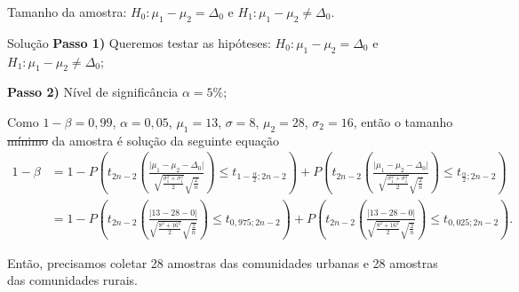 \documentclass[9pt]{beamer}
\begin{document}
\begin{frame}{Tamanho da amostra: $H_0:\mu_1 - \mu_2 = \Delta_0$ e $H_1: \mu_1 - \mu_2 \neq \Delta_0$.}

\begin{block}{Solução}
	\textbf{Passo 1)} Queremos testar as hipóteses: $H_0: \mu_1 - \mu_2 = \Delta_0$ e $H_1: \mu_1 - \mu_2 \neq \Delta_0$;
	
	\textbf{Passo 2)} Nível de significância $\alpha=5\%$;
	
	Como $1-\beta=0,99$, $\alpha=0,05$, $\mu_1=13$, $\sigma=8$, $\mu_2=28$, $\sigma_2=16$, então o tamanho \sout{mínimo} da amostra é solução da seguinte equação
	\tiny
	\begin{align*}
		1-\beta &=  1 - P\left( t_{2n-2}\left( \frac{\lvert \mu_1 - \mu_2 - \Delta_0 \rvert}{\sqrt{\frac{\sigma_1^2 + \sigma_1^2}{2}} \sqrt{\frac{2}{n}}} \right) \leq t_{1-\frac{\alpha}{2};2n-2} \right)+P\left( t_{2n-2}\left( \frac{\lvert \mu_1 - \mu_2 - \Delta_0\rvert}{\sqrt{\frac{\sigma_1^2 + \sigma_1^2}{2}} \sqrt{\frac{2}{n}}} \right) \leq t_{\frac{\alpha}{2};2n-2} \right)\\
		&=  1 - P\left( t_{2n-2}\left( \frac{\lvert 13 - 28 - 0 \rvert}{\sqrt{\frac{8^2 + 16^2}{2}} \sqrt{\frac{2}{n}}} \right) \leq t_{0,975;2n-2} \right)+P\left( t_{2n-2}\left( \frac{\lvert 13 - 28 - 0\rvert}{\sqrt{\frac{8^2 + 16^2}{2}} \sqrt{\frac{2}{n}}} \right) \leq t_{0,025;2n-2} \right).
	\end{align*}
	\normalsize
	
	Então, precisamos coletar 28 amostras das comunidades urbanas e 28 amostras das comunidades rurais.
\end{block}
\end{frame}
\end{document}
